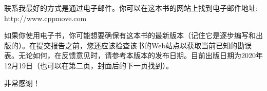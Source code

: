 联系我最好的方式是通过电子邮件。你可以在这本书的网站上找到电子邮件地址:\\http://www.cppmove.com

如果你使用电子书，你可能想要确保有这本书的最新版本（记住它是逐步编写和出版的）。在提交报告之前，您还应该检查该书的Web站点以获取当前已知的勘误表。无论如何，在反馈意见时，请参考本版本的发布日期。目前出版日期为2020年12月19日（也可以在第二页，封面后的下一页找到）。

非常感谢！






















